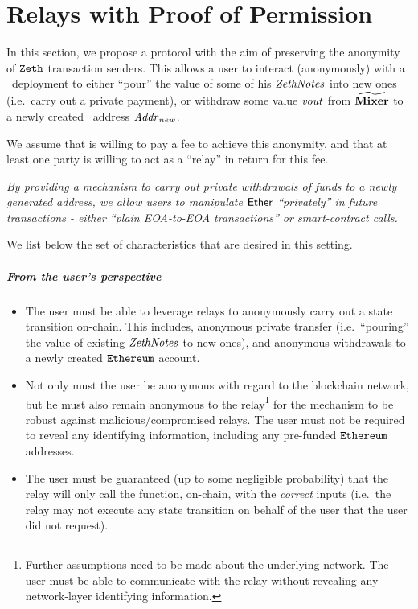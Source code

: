 
\chapter{Relays with Proof of Permission}\label{relay-proof-permission}

In this section, we propose a protocol with the aim of preserving the anonymity of $\texttt{Zeth}$ transaction senders. This allows a user \userZethAccount{} to interact (anonymously) with a \zeth~deployment to either ``pour'' the value of some of his $\mathit{ZethNotes}$ into new ones (i.e.~carry out a private payment), or withdraw some value $\mathit{vout}$ from $\widetilde{\mathbf{Mixer}}{}$ to a newly created \ethereum~address $\mathit{Addr}_{new}$.

We assume that \userZethAccount{} is willing to pay a fee to achieve this anonymity, and that at least one party \relayEthAccount{} is willing to act as a ``relay'' in return for this fee.

\emph{By providing a mechanism to carry out private withdrawals of \zeth{} funds to a newly generated \ethereum{} address, we allow \ethereum{} users to manipulate $\mathsf{Ether}$ ``privately'' in future transactions - either ``plain EOA-to-EOA transactions'' or smart-contract calls.}

\medskip

We list below the set of characteristics that are desired in this setting.

\paragraph{From the user's perspective}

\begin{itemize}
  \item The user must be able to leverage relays to anonymously carry out a \zeth{} state transition on-chain. This includes, anonymous private transfer (i.e.~``pouring'' the value of existing $\mathit{ZethNotes}$ to new ones), and anonymous withdrawals to a newly created $\texttt{Ethereum}$ account.
  \item Not only must the user be anonymous with regard to the blockchain network, but he must also remain anonymous to the relay\footnote{Further assumptions need to be made about the underlying network. The user must be able to communicate with the relay without revealing any network-layer identifying information.} for the mechanism to be robust against malicious/compromised relays. The user must not be required to reveal any identifying information, including any pre-funded $\texttt{Ethereum}$ addresses.
  \item The user must be guaranteed (up to some negligible probability) that the relay will only call the \mix{} function, on-chain, with the \emph{correct} inputs (i.e.~the relay may not execute any state transition on behalf of the user that the user did not request).
\end{itemize}

